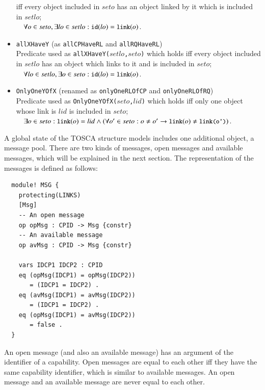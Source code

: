 \documentclass[12pt]{report}
\newcommand{\ra}{\rightarrow}
\newcommand{\mbstt}[1]{\mbox{\small{\tt {#1}}}}
\newcommand{\stt}[1]{{\small{\tt {#1}}}}
\begin{document}
\begin{itemize}
  iff every object included in $seto$ has an object linked by it
  which is included in $setlo$;\\$~~~~\forall o\in seto,\exists lo\in
  setlo:\mbstt{id}(lo)=\mbstt{link}(o)$.
\item \stt{allXHaveY} (as \stt{allCPHaveRL} and
  \stt{allRQHaveRL})\\ Predicate used as
  \stt{allXHaveY($setlo$,$seto$)} which holds iff every object
  included in $setlo$ has an object which links to it and is included
  in $seto$;\\$~~~~\forall lo\in setlo,\exists o\in
  seto:\mbstt{id}(lo)=\mbstt{link}(o)$.
\item \stt{OnlyOneYOfX} (renamed as \stt{onlyOneRLOfCP} and
  \stt{onlyOneRLOfRQ})\\ Predicate used as
  \stt{OnlyOneYOfX($seto$,$lid$)} which holds iff only one object
  whose link is $lid$ is included in $seto$;\\$~~~~\exists o\in seto:
  \mbstt{link}(o)=lid\land(\forall o'\in seto:o\ne
  o'\ra\mbstt{link}(o)\ne\mbstt{link(o')})$.
\end{itemize}

A global state of the TOSCA structure models includes one additional
object, a message pool. There are two kinds of messages, open messages
and available messages, which will be explained in the next
section. The representation of the messages is defined as follows:
\small
\begin{verbatim}
  module! MSG {
    protecting(LINKS)
    [Msg]
    -- An open message
    op opMsg : CPID -> Msg {constr}
    -- An available message
    op avMsg : CPID -> Msg {constr}
  
    vars IDCP1 IDCP2 : CPID 
    eq (opMsg(IDCP1) = opMsg(IDCP2))
       = (IDCP1 = IDCP2) .
    eq (avMsg(IDCP1) = avMsg(IDCP2))
       = (IDCP1 = IDCP2) .
    eq (opMsg(IDCP1) = avMsg(IDCP2))
       = false .
  }    
\end{verbatim}
\normalsize
An open message (and also an available message) has an argument of the
identifier of a capability. Open messages are equal to each other iff
they have the same capability identifier, which is similar to
available messages. An open message and an available message are never
equal to each other.
\end{document}
